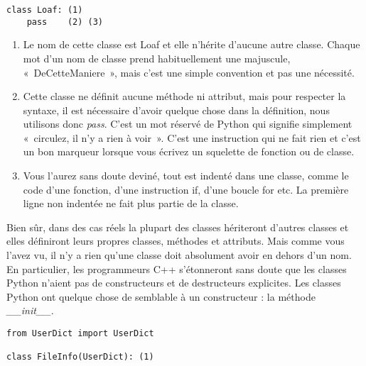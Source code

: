 \begin{example}
\begin{lstlisting}
class Loaf: (1)
    pass    (2) (3)
\end{lstlisting}
\end{example}

\begin{enumerate}
\item{Le nom de cette classe est Loaf et elle n'hérite d'aucune autre classe. Chaque mot d'un nom de classe prend habituellement une majuscule, «~DeCetteManiere~», mais c'est une simple convention et pas une nécessité. }
\item{Cette classe ne définit aucune méthode ni attribut, mais pour respecter la syntaxe, il est nécessaire d'avoir quelque chose dans la définition, nous utilisons donc \emph{pass}. C'est un mot réservé de Python qui signifie simplement «~circulez, il n'y a rien à voir~». C'est une instruction qui ne fait rien et c'est un bon marqueur lorsque vous écrivez un squelette de fonction ou de classe.}
\item{Vous l'aurez sans doute deviné, tout est indenté dans une classe, comme le code d'une fonction, d'une instruction if, d'une boucle for etc. La première ligne non indentée ne fait plus partie de la classe.}
\end{enumerate}


Bien sûr, dans des cas réels la plupart des classes hériteront d'autres classes et elles définiront leurs propres classes, méthodes et attributs. Mais comme vous l'avez vu, il n'y a rien qu'une classe doit absolument avoir en dehors d'un nom. En particulier, les programmeurs C++ s'étonneront sans doute que les classes Python n'aient pas de constructeurs et de destructeurs explicites. Les classes Python ont quelque chose de semblable à un constructeur : la méthode \emph{\_\_init\_\_}.

\begin{example}
\begin{lstlisting}
from UserDict import UserDict

class FileInfo(UserDict): (1)
\end{lstlisting}
\end{example}

